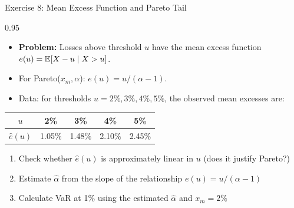 \documentclass[9pt, aspectratio=169, t]{beamer}
\begin{document}
\begin{frame}{Exercise 8: Mean Excess Function and Pareto Tail}
\begin{cminipage}{0.95\textwidth}
    \begin{itemize}\setlength{\itemsep}{0pt}
        \item \textbf{Problem:} Losses above threshold $u$ have the mean excess function $e(u) = \mathbb{E}[X - u \mid X > u]$.
        \item For Pareto($x_m, \alpha$): $e(u) = u / (\alpha - 1)$.
        \item Data: for thresholds $u = 2\%, 3\%, 4\%, 5\%$, the observed mean excesses are:
    \end{itemize}
    \renewcommand{\arraystretch}{1.1}
    \begin{tabular}{ccccc}
    \toprule
    $u$ & 2\% & 3\% & 4\% & 5\% \\
    \midrule
    $\hat{e}(u)$ & 1.05\% & 1.48\% & 2.10\% & 2.45\% \\
    \bottomrule
    \end{tabular}
    \begin{enumerate}\setlength{\itemsep}{0pt}
        \item Check whether $\hat{e}(u)$ is approximately linear in $u$ (does it justify Pareto?)
        \item Estimate $\hat{\alpha}$ from the slope of the relationship $e(u) = u/(\alpha-1)$
        \item Calculate VaR at 1\% using the estimated $\hat{\alpha}$ and $x_m = 2\%$
    \end{enumerate}
\end{cminipage}
\end{frame}
\end{document}
